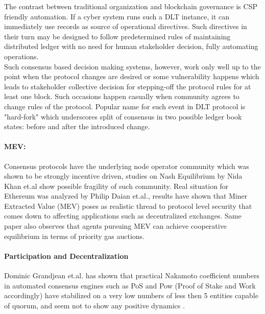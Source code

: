\documentclass{article}
\begin{document}
\begin{CJK}{UTF8}{gbsn}
\begin{multicols}{2}
        The contrast between traditional organization and blockchain governance is CSP friendly automation. If a cyber system runs such a DLT instance, it can immediately use records as source of operational directives. Such directives in their turn may be designed to follow predetermined rules of maintaining distributed ledger with no need for human stakeholder decision, fully automating operations.\\
        Such consensus based decision making systems, however, work only well up to the point when the protocol changes are desired or some vulnerability happens which leads to stakeholder collective decision for stepping-off the protocol rules for at least one block\cite{Liu2021}. Such occasions happen casually when community agrees to change rules of the protocol. Popular name for such event in DLT protocol is "hard-fork" which underscores split of consensus in two possible ledger book states: before and after the introduced change.\\
        \paragraph{MEV:} Consensus protocols have the underlying node operator community which was shown to be strongly incentive driven, studies on Nash Equilibrium by Nida Khan et.al \cite{Nida2020} show possible fragility of such community. Real situation for Ethereum was analyzed by Philip Daian et.al., results have shown that Miner Extracted Value (MEV) poses as realistic thread to protocol level security that comes down to affecting applications such as decentralized exchanges\cite{Philip2019}. Same paper also observes that agents pursuing MEV can achieve cooperative equilibrium in terms of priority gas auctions.
        \paragraph{Participation and Decentralization} Dominic Grandjean et.al. has shown that practical Nakamoto coefficient numbers in automated consensus engines such as PoS and Pow (Proof of Stake and Work accordingly) have stabilized on a very low numbers of less then 5 entities capable of quorum, and seem not to show any positive dynamics \cite{Dominic2023}.


\end{multicols}
\end{CJK}
\end{document}
